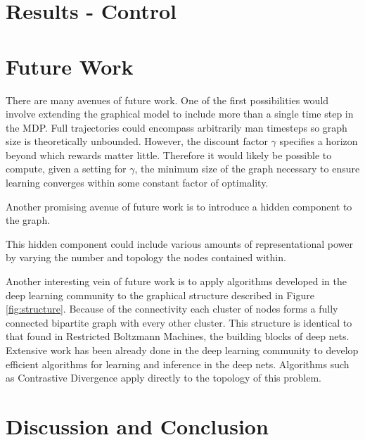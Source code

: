 \documentclass{article} %
\begin{document}
\section{Results - Control}

\section{Future Work}
There are many avenues of future work. One of the first possibilities would involve extending the graphical model to include more than a single time step in the MDP. Full trajectories could encompass arbitrarily man timesteps so graph size is theoretically unbounded. However, the discount factor $\gamma$ specifies a horizon beyond which rewards matter little. Therefore it would likely be possible to compute, given a setting for $\gamma$, the minimum size of the graph necessary to ensure learning converges within some constant factor of optimality. 

Another promising avenue of future work is to introduce a hidden component to the graph. 

This hidden component could include various amounts of representational power by varying the number and topology the nodes contained within. 

Another interesting vein of future work is to apply algorithms developed in the deep learning community to the graphical structure described in Figure \ref{fig:structure}. Because of the connectivity each cluster of nodes forms a fully connected bipartite graph with every other cluster. This structure is identical to that found in Restricted Boltzmann Machines, the building blocks of deep nets. Extensive work has been already done in the deep learning community to develop efficient algorithms for learning and inference in the deep nets. Algorithms such as Contrastive Divergence \cite{hinton02} apply directly to the topology of this problem. 

\section{Discussion and Conclusion}




\end{document}
